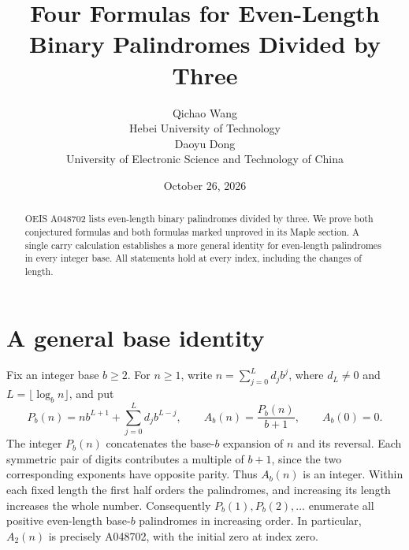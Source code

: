 \documentclass[10pt]{article}
\title{Four Formulas for Even-Length Binary Palindromes Divided by Three}
\author{Qichao Wang\\{\small Hebei University of Technology}\\[0.3em]
Daoyu Dong\\{\small University of Electronic Science and Technology of China}}
\date{October 26, 2026}
\begin{document}
\maketitle
\begin{abstract}
OEIS A048702 lists even-length binary palindromes divided by three.
We prove both conjectured formulas and both formulas marked unproved
in its Maple section. A single carry calculation establishes a more
general identity for even-length palindromes in every integer base.
All statements hold at every index, including the changes of length.
\end{abstract}

\section{A general base identity}
Fix an integer base $b\ge2$. For $n\ge1$, write
$n=\sum_{j=0}^{L}d_jb^j$, where $d_L\ne0$ and
$L=\lfloor\log_b n\rfloor$, and put
\[
 P_b(n)=n b^{L+1}+\sum_{j=0}^{L}d_jb^{L-j},\qquad
 A_b(n)=\frac{P_b(n)}{b+1},\qquad A_b(0)=0.
\]
The integer $P_b(n)$ concatenates the base-$b$ expansion of $n$
and its reversal. Each symmetric pair of digits contributes a multiple
of $b+1$, since the two corresponding exponents have opposite parity.
Thus $A_b(n)$ is an integer. Within each fixed length the first half
orders the palindromes, and increasing its length increases the whole
number. Consequently $P_b(1),P_b(2),\ldots$ enumerate all positive
even-length base-$b$ palindromes in increasing order. In particular,
$A_2(n)$ is precisely A048702, with the initial zero at index zero.
\end{document}
